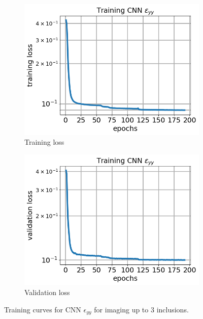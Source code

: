 \documentclass[12pt]{article}
\newcommand{\nhgfigheight}{4.0cm}
\begin{document}
\begin{figure}[h]
  \centering
  \begin{subfigure}[b]{0.45\linewidth}
    \includegraphics[totalheight=\nhgfigheight]{Figures/final3/training/eyy/field_strainyy_plot_loss.png}
    \caption{Training loss}
  \end{subfigure}
  \begin{subfigure}[b]{0.45\linewidth}
    \includegraphics[totalheight=\nhgfigheight]{Figures/final3/training/eyy/field_strainyy_plot_val_loss.png}
    \caption{Validation loss}
  \end{subfigure}
\caption{\label{fig:threeinc:traineyy} Training curves for CNN $\epsilon_{yy}$ for imaging up to 3 inclusions.}
\end{figure} 
\end{document}
